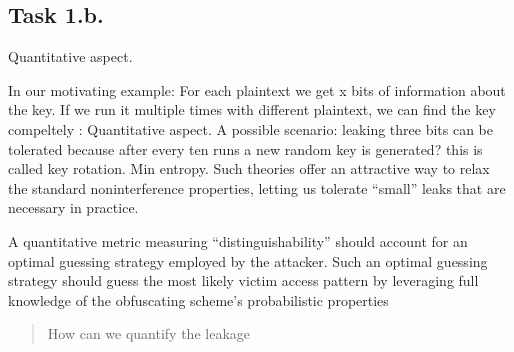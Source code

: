 \subsection{Task 1.b.} Quantitative aspect.

In our motivating example: For each plaintext we get x bits of information about the key. 
%
If we run it multiple times with different plaintext, we can find the key compeltely : Quantitative aspect.
%
A possible scenario: leaking three bits can be tolerated because after every ten runs a new random key is generated? this is called key rotation.
Min entropy.
Such theories offer an attractive way to relax the standard noninterference properties, letting us tolerate “small” leaks that are necessary in practice. 


A quantitative metric measuring “distinguishability”
should account for an optimal guessing strategy employed by the
attacker. Such an optimal guessing strategy should guess the most
likely victim access pattern by leveraging full knowledge of the
obfuscating scheme’s probabilistic properties


\begin{quote} 
    How can we quantify the leakage 
\end{quote}
